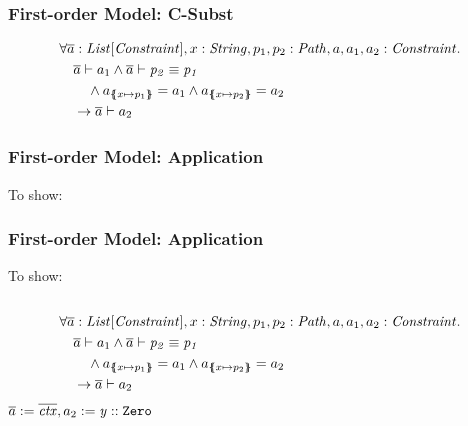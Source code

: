 \begin{frame}
\frametitle{First-order Model: C-Subst}
\begin{prooftree}
\end{prooftree}
\vfill
\begin{align*}
&\forall \ovl a: \Constrs, x: \String, p_1, p_2: \Path, a, a_1, a_2: \Constr. \\
&\quad \entails{\ovl a}{a_1}
         \land \entails{\ovl a}{\pathEq{p_2}{p_1}}\\
&\qquad  \land a_{\sub{x}{p_1}} = a_1 \land a_{\sub{x}{p_2}} = a_2\\
&\quad   \rightarrow \entails{\ovl a}{a_2}
\end{align*}
\end{frame}

\begin{frame}[t]
\frametitle{First-order Model: Application}
To show: 
\end{frame}

\begin{frame}[t]
\frametitle{First-order Model: Application}
To show: 
\quad\\\quad\\
\begin{align*}
&\forall \ovl a: \Constrs, x: \String, p_1, p_2: \Path, a, a_1, a_2: \Constr. \\
&\quad \entails{\ovl a}{a_1}
         \land \entails{\ovl a}{\pathEq{p_2}{p_1}}\\
&\qquad  \land a_{\sub{x}{p_1}} = a_1 \land a_{\sub{x}{p_2}} = a_2\\
&\quad   \rightarrow \entails{\ovl a}{a_2}
\end{align*}
\pause
\onslide<+->
$\ovl a := \ovl{\mIt{ctx}}, a_2 := \instOf{y}{\texttt{Zero}}$
\end{frame}

